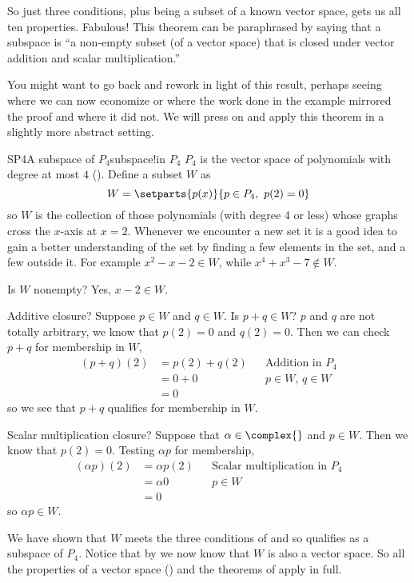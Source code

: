 %
So just three conditions, plus being a subset of a known vector space, gets us all ten properties.  Fabulous!
This theorem can be paraphrased by saying that a subspace is ``a non-empty subset (of a vector space) that is closed under vector addition and scalar multiplication.''\par
%
You might want to go back and rework  in light of this result, perhaps seeing where we can now economize or where the work done in the example mirrored the proof and where it did not.  We will press on and apply this theorem in a slightly more abstract setting.
%
\begin{example}{SP4}{A subspace of $P_4$}{subspace!in $P_4$}
$P_4$ is the vector space of polynomials with degree at most $4$ ().  Define a subset $W$ as
%
\begin{equation*}
W=\setparts{p(x)}{p\in P_4,\ p(2)=0}
\end{equation*}
%
so $W$ is the collection of those polynomials (with degree 4 or less) whose graphs  cross the $x$-axis at $x=2$.  Whenever we encounter a new set it is a good idea to gain a better understanding of the set by finding a few elements in the set, and a few outside it.  For example $x^2-x-2\in W$, while $x^4+x^3-7\not\in W$.\par
%
Is $W$ nonempty?  Yes, $x-2\in W$.\par
%
Additive closure?  Suppose $p\in W$ and $q\in W$.  Is $p+q\in W$?  $p$ and $q$ are not totally arbitrary, we know that $p(2)=0$ and $q(2)=0$.  Then we can check $p+q$ for membership in $W$,
%
\begin{align*}
(p+q)(2)&=p(2)+q(2)&&\text{Addition in }P_4\\
&=0+0&&p\in W,\,q\in W\\
&=0
\end{align*}
%
so we see that $p+q$ qualifies for membership in $W$.\par
%
Scalar multiplication closure?  Suppose that $\alpha\in\complex{\null}$ and $p\in W$.  Then we know that $p(2)=0$.  Testing $\alpha p$ for membership,
%
\begin{align*}
(\alpha p)(2)&=\alpha p(2)&&\text{Scalar multiplication in }P_4\\
&=\alpha 0&&p\in W\\
&=0
\end{align*}
%
so $\alpha p\in W$.\par
%
We have shown that $W$ meets the three conditions of  and so qualifies as a subspace of $P_4$.  Notice that by  we now know that $W$ is also a vector space.  So all the properties of a vector space () and the theorems of  apply in full.\par
%
\end{example}
